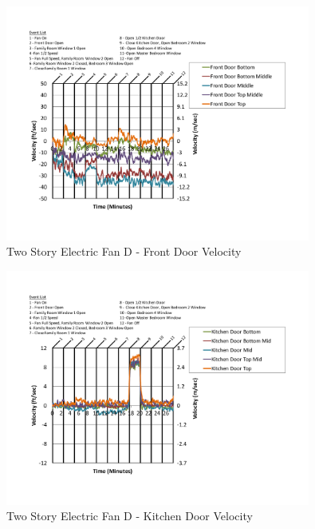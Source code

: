 \documentclass{article}
\begin{document}
\begin{appendices}
	\begin{figure}[H]
		\centering
		\includegraphics[height=3.05in,trim=0.67in 1.1in 0.67in 0.8in,clip=true]{0_Images/Results_Charts/ColdFlow/Two_Story/Electric/D/Front_Door_Velocity.pdf}
		\caption{Two Story Electric Fan D - Front Door Velocity}
	\end{figure}
 

	\begin{figure}[H]
		\centering
		\includegraphics[height=3.05in,trim=0.67in 1.1in 0.67in 0.8in,clip=true]{0_Images/Results_Charts/ColdFlow/Two_Story/Electric/D/Kitchen_Door_Velocity.pdf}
		\caption{Two Story Electric Fan D - Kitchen Door Velocity}
	\end{figure}
 
	\clearpage


\end{appendices}
\end{document}
